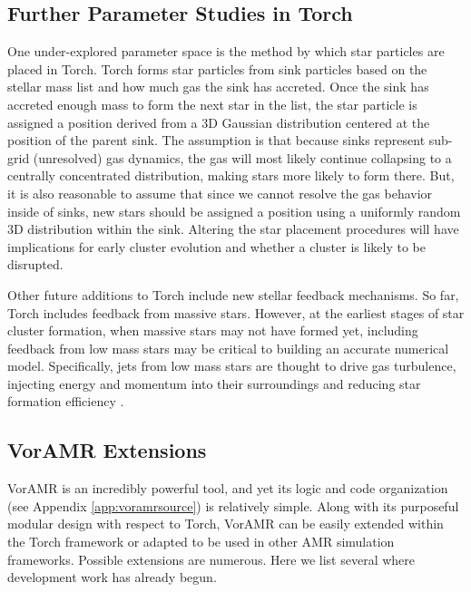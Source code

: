 \documentclass[twoside]{drexel-thesis}
\begin{document}
\begin{thesis}
\subsection{Further Parameter Studies in Torch}
One under-explored parameter space is the method by which star particles are placed in Torch. Torch forms star particles from sink particles based on the stellar mass list and how much gas the sink has accreted. Once the sink has accreted enough mass to form the next star in the list, the star particle is assigned a position derived from a 3D Gaussian distribution centered at the position of the parent sink. The assumption is that because sinks represent sub-grid (unresolved) gas dynamics, the gas will most likely continue collapsing to a centrally concentrated distribution, making stars more likely to form there. But, it is also reasonable to assume that since we cannot resolve the gas behavior inside of sinks, new stars should be assigned a position using a uniformly random 3D distribution within the sink. Altering the star placement procedures will have implications for early cluster evolution and whether a cluster is likely to be disrupted.

Other future additions to Torch include new stellar feedback mechanisms. So far, Torch includes feedback from massive stars. However, at the earliest stages of star cluster formation, when massive stars may not have formed yet, including feedback from low mass stars may be critical to building an accurate numerical model. Specifically, jets from low mass stars are thought to drive gas turbulence, injecting energy and momentum into their surroundings and reducing star formation efficiency \citep{bally_protostellar_2016}.

\subsection{VorAMR Extensions}
VorAMR is an incredibly powerful tool, and yet its logic and code organization (see Appendix \ref{app:voramrsource}) is relatively simple. Along with its purposeful modular design with respect to Torch, VorAMR can be easily extended within the Torch framework or adapted to be used in other AMR simulation frameworks. Possible extensions are numerous. Here we list several where development work has already begun.


\end{thesis}
\end{document}

